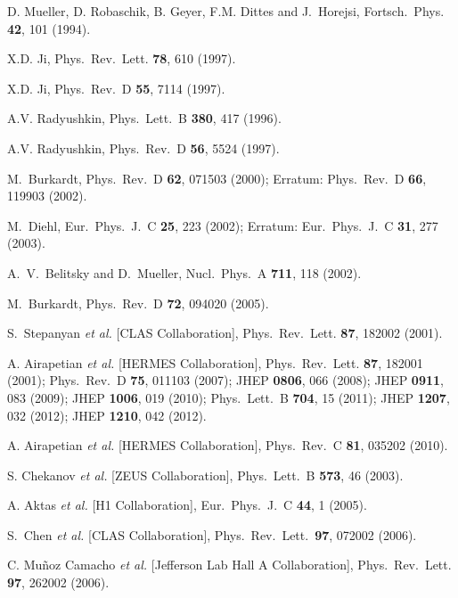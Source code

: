 \documentclass[twocolumn,nofootinbib,showpacs,prl,superscriptaddress,secnumarabic,amssymb,nobibnotes,aps,floatfix]{revtex4}
\begin{document}
\begin{thebibliography}{99}

D. Mueller, D. Robaschik, B. Geyer, F.M. Dittes and J.~Horejsi,
Fortsch.\ Phys. {\bf 42}, 101 (1994).
  
X.D. Ji,
Phys.\ Rev.\ Lett. {\bf 78}, 610 (1997).

X.D. Ji,
Phys.\ Rev.\ D {\bf 55}, 7114 (1997).

A.V. Radyushkin,
Phys.\ Lett.\  B {\bf 380}, 417 (1996).

A.V. Radyushkin,
Phys.\ Rev.\ D {\bf 56}, 5524 (1997).

  M.~Burkardt,
  Phys.\ Rev.\ D {\bf 62}, 071503 (2000);
  Erratum: Phys.\ Rev.\ D {\bf 66}, 119903 (2002).

  M.~Diehl,
  Eur.\ Phys.\ J.\ C {\bf 25}, 223 (2002);
  Erratum: Eur.\ Phys.\ J.\ C {\bf 31}, 277 (2003).
 
  A.~V.~Belitsky and D.~Mueller,
  Nucl.\ Phys.\ A {\bf 711}, 118 (2002).

  M.~Burkardt,
  Phys.\ Rev.\ D {\bf 72}, 094020 (2005).

S.~Stepanyan {\it et al.} [CLAS Collaboration],
Phys.\ Rev.\ Lett. {\bf 87}, 182002 (2001).

A. Airapetian {\it et al.} [HERMES Collaboration],
Phys.\ Rev.\ Lett. {\bf 87}, 182001 (2001);
Phys.\ Rev.\  D {\bf 75}, 011103 (2007);
JHEP {\bf 0806}, 066 (2008);
JHEP {\bf 0911}, 083 (2009);
JHEP {\bf 1006}, 019 (2010);
Phys.\ Lett.\ B {\bf 704}, 15 (2011);
JHEP {\bf 1207}, 032 (2012);
JHEP {\bf 1210}, 042 (2012).

A. Airapetian {\it et al.} [HERMES Collaboration],
Phys.\ Rev.\ C {\bf 81}, 035202 (2010).

S. Chekanov {\it et al.} [ZEUS Collaboration],
Phys.\ Lett.\  B {\bf 573}, 46 (2003).

A. Aktas {\it et al.} [H1 Collaboration],
Eur.\ Phys.\ J.\ C {\bf 44}, 1 (2005).

S.~Chen {\it et al.} [CLAS Collaboration],
Phys.\ Rev.\ Lett.\ {\bf 97}, 072002 (2006).

C. Mu\~noz Camacho {\it et al.} [Jefferson Lab Hall A Collaboration],
Phys.\ Rev.\ Lett. {\bf 97}, 262002 (2006).


\end{thebibliography}
\end{document}
